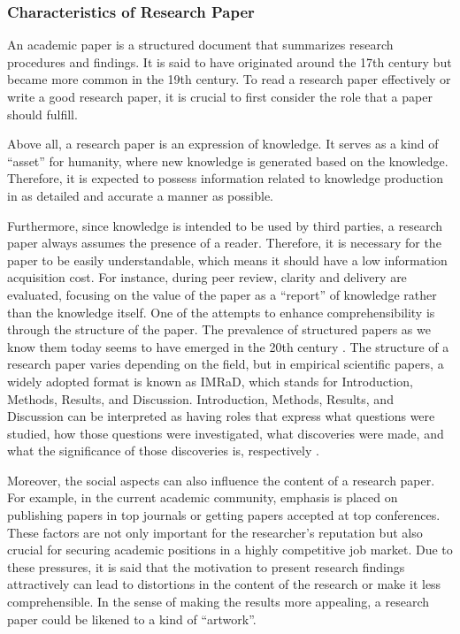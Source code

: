 \subsubsection{Characteristics of Research Paper}
An academic paper is a structured document that summarizes research procedures and findings. It is said to have originated around the 17th century but became more common in the 19th century. To read a research paper effectively or write a good research paper, it is crucial to first consider the role that a paper should fulfill. 

Above all, a research paper is an expression of knowledge. It serves as a kind of ``asset'' for humanity, where new knowledge is generated based on the knowledge. Therefore, it is expected to possess information related to knowledge production in as detailed and accurate a manner as possible.

Furthermore, since knowledge is intended to be used by third parties, a research paper always assumes the presence of a reader. Therefore, it is necessary for the paper to be easily understandable, which means it should have a low information acquisition cost. For instance, during peer review, clarity and delivery are evaluated, focusing on the value of the paper as a ``report'' of knowledge rather than the knowledge itself. One of the attempts to enhance comprehensibility is through the structure of the paper. The prevalence of structured papers as we know them today seems to have emerged in the 20th century \cite{harmon1989structure}. 
The structure of a research paper varies depending on the field, but in empirical scientific papers, a widely adopted format is known as IMRaD, which stands for Introduction, Methods, Results, and Discussion. Introduction, Methods, Results, and Discussion can be interpreted as having roles that express what questions were studied, how those questions were investigated, what discoveries were made, and what the significance of those discoveries is, respectively \cite{gastel2022write}.

Moreover, the social aspects can also influence the content of a research paper. For example, in the current academic community, emphasis is placed on publishing papers in top journals or getting papers accepted at top conferences. These factors are not only important for the researcher's reputation but also crucial for securing academic positions in a highly competitive job market. Due to these pressures, it is said that the motivation to present research findings attractively can lead to distortions in the content of the research or make it less comprehensible. In the sense of making the results more appealing, a research paper could be likened to a kind of ``artwork''.

